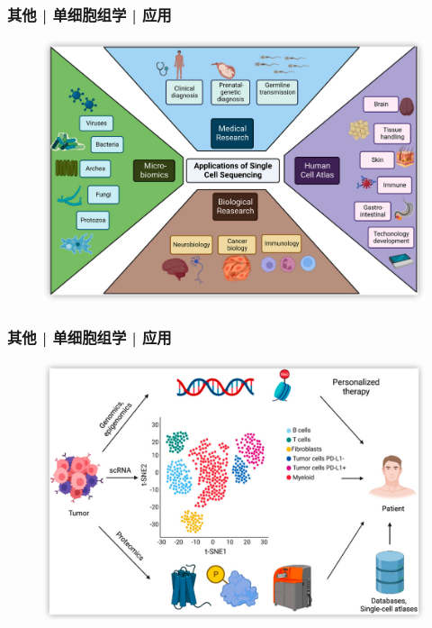 \documentclass[11pt]{ctexbeamer}
\begin{document}
\begin{frame}
	\frametitle{其他 | 单细胞组学 | 应用}
		\begin{figure}
		\includegraphics[width=\textwidth]{sc_application_01.png}
	\end{figure}
\end{frame}

\begin{frame}
	\frametitle{其他 | 单细胞组学 | 应用}
			\begin{figure}
		\includegraphics[width=\textwidth]{sc_application_02.png}
	\end{figure}
\end{frame}
\end{document}
